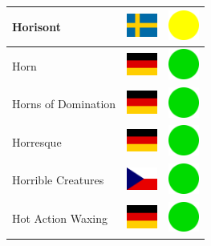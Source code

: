 \documentclass[12pt, a4paper, twoside]{report}
\begin{document}
\begin{center}
\begin{longtable}{|p{5cm}|p{2cm}|p{2cm}|}
 Horisont                                                   & \includegraphics[width=1cm]{../4x3/se} &   \includegraphics[width=1cm]{../likes/m} \\ \hline
 Horn                                                       & \includegraphics[width=1cm]{../4x3/de} &   \includegraphics[width=1cm]{../likes/y} \\ \hline
 Horns of Domination                                        & \includegraphics[width=1cm]{../4x3/de} &   \includegraphics[width=1cm]{../likes/y} \\ \hline
 Horresque                                                  & \includegraphics[width=1cm]{../4x3/de} &   \includegraphics[width=1cm]{../likes/y} \\ \hline
 Horrible Creatures                                         & \includegraphics[width=1cm]{../4x3/cz} &   \includegraphics[width=1cm]{../likes/y} \\ \hline
 Hot Action Waxing                                          & \includegraphics[width=1cm]{../4x3/de} &   \includegraphics[width=1cm]{../likes/y} \\ \hline

\end{longtable}
\end{center}
\end{document}
